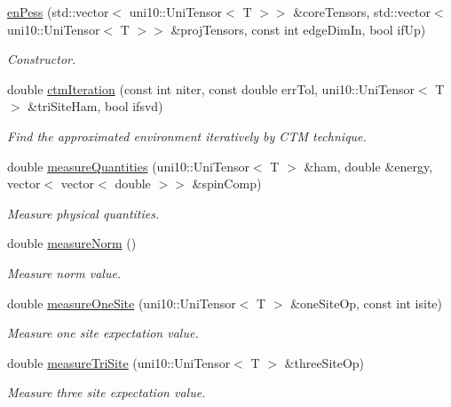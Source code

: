 \begin{DoxyCompactItemize}
\item 
\hyperlink{classenPess_a22042dc17e149c8c1a30f3fa1699a5c0}{en\+Pess} (std\+::vector$<$ uni10\+::\+Uni\+Tensor$<$ T $>$$>$ \&core\+Tensors, std\+::vector$<$ uni10\+::\+Uni\+Tensor$<$ T $>$$>$ \&proj\+Tensors, const int edge\+Dim\+In, bool if\+Up)
\begin{DoxyCompactList}\small\item\em Constructor. \end{DoxyCompactList}\item 
double \hyperlink{classenPess_ac16ae09e08c05c7a705f0bca507ed1fa}{ctm\+Iteration} (const int niter, const double err\+Tol, uni10\+::\+Uni\+Tensor$<$ T $>$ \&tri\+Site\+Ham, bool ifsvd)
\begin{DoxyCompactList}\small\item\em Find the approximated environment iteratively by C\+TM technique. \end{DoxyCompactList}\item 
double \hyperlink{classenPess_a5e1fbb61684a82a77073654cf597244c}{measure\+Quantities} (uni10\+::\+Uni\+Tensor$<$ T $>$ \&ham, double \&energy, vector$<$ vector$<$ double $>$$>$ \&spin\+Comp)
\begin{DoxyCompactList}\small\item\em Measure physical quantities. \end{DoxyCompactList}\item 
double \hyperlink{classenPess_a2ee28c7ee87b2429dc0bb5ae7a0dd843}{measure\+Norm} ()
\begin{DoxyCompactList}\small\item\em Measure norm value. \end{DoxyCompactList}\item 
double \hyperlink{classenPess_ab6c814239e7ab22f37415e91999dabfb}{measure\+One\+Site} (uni10\+::\+Uni\+Tensor$<$ T $>$ \&one\+Site\+Op, const int isite)
\begin{DoxyCompactList}\small\item\em Measure one site expectation value. \end{DoxyCompactList}\item 
double \hyperlink{classenPess_a748a84f5026dbfb3963f2f0b34fa37d6}{measure\+Tri\+Site} (uni10\+::\+Uni\+Tensor$<$ T $>$ \&three\+Site\+Op)
\begin{DoxyCompactList}\small\item\em Measure three site expectation value. \end{DoxyCompactList}\end{DoxyCompactItemize}
